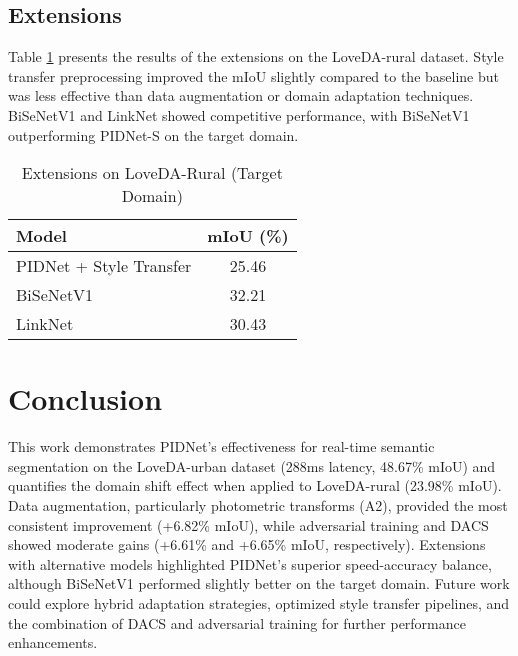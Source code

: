 \documentclass{article}
\begin{document}
\begin{multicols}{2}
		\subsection{Extensions}
		Table \ref{tab:extensions} presents the results of the extensions on the LoveDA-rural dataset. Style transfer preprocessing improved the mIoU slightly compared to the baseline but was less effective than data augmentation or domain adaptation techniques. BiSeNetV1 and LinkNet showed competitive performance, with BiSeNetV1 outperforming PIDNet-S on the target domain.
		
		\begin{table}[h]
			\centering
			\caption{Extensions on LoveDA-Rural (Target Domain)}
			\label{tab:extensions}
			\begin{tabular}{|l|c|}
				\hline
				Model & mIoU (\%) \\ \hline
				PIDNet + Style Transfer & 25.46 \\ \hline
				BiSeNetV1 & 32.21 \\ \hline
				LinkNet & 30.43 \\ \hline
			\end{tabular}
		\end{table}
		
		\section{Conclusion}
		This work demonstrates PIDNet's effectiveness for real-time semantic segmentation on the LoveDA-urban dataset (288ms latency, 48.67\% mIoU) and quantifies the domain shift effect when applied to LoveDA-rural (23.98\% mIoU). Data augmentation, particularly photometric transforms (A2), provided the most consistent improvement (+6.82\% mIoU), while adversarial training and DACS showed moderate gains (+6.61\% and +6.65\% mIoU, respectively). Extensions with alternative models highlighted PIDNet's superior speed-accuracy balance, although BiSeNetV1 performed slightly better on the target domain. Future work could explore hybrid adaptation strategies, optimized style transfer pipelines, and the combination of DACS and adversarial training for further performance enhancements.
		
	\end{multicols}
	
	
	
	
\end{document}
